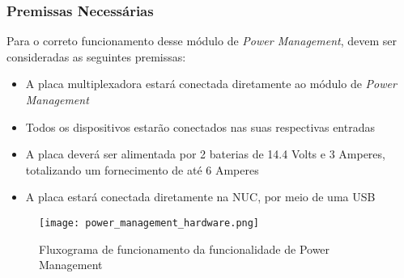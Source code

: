 \subsubsection{Premissas Necessárias}
Para o correto funcionamento desse módulo de \textit{Power Management}, devem ser consideradas as seguintes premissas:
\begin{itemize}
	\item A placa multiplexadora estará conectada diretamente ao módulo de \textit{Power Management} 
	\item Todos os dispositivos estarão conectados nas suas respectivas entradas
	\item A placa deverá ser alimentada por 2 baterias de 14.4 Volts e 3 Amperes, totalizando um fornecimento de até 6 Amperes
	\item A placa estará conectada diretamente na NUC, por meio de uma USB	
	
\end{itemize}
\begin{figure}[h]
	\centering
	\texttt{[image: power\_management\_hardware.png]}
	\caption{Fluxograma de funcionamento da funcionalidade de Power Management}
	\label{fig:power_management_hardware}
\end{figure}
